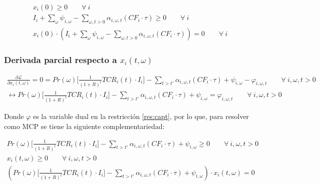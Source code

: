 \begin{footnotesize}
\begin{align}
    x_i(0)\geq 0 \qquad \forall \  i \\
    I_i  + \sum_{\omega}\psi_{i,\omega} -\sum_{\omega, t>0} \alpha_{i,\omega,t}(CF_i\cdot \tau) \geq 0  \qquad \forall \  i\\
    x_i(0)\cdot(I_i  + \sum_{\omega}\psi_{i,\omega} -\sum_{\omega, t>0} \alpha_{i,\omega,t}(CF_i\cdot \tau))=0 \qquad \forall \  i
\end{align}
\end{footnotesize}



\subsubsection{Derivada parcial respecto a $x_i(t,\omega)$}

\begin{footnotesize}
\begin{align}
    \frac{\partial \mathcal{L} }{\partial x_i(t,\omega)}= 0 = Pr(\omega) \Bigg[\frac{1}{(1+R)^t}TCR_i(t) \cdot I_i \Bigg] - \sum_{t> t\prime}\alpha_{i,\omega,t} ( CF_i \cdot \tau)+ \psi_{i,\omega}-\varphi_{i,\omega,t} \qquad  \forall \  i, \omega, t> 0\\
    \leftrightarrow Pr(\omega) \Bigg[\frac{1}{(1+R)^t}TCR_i(t) \cdot I_i \Bigg] - \sum_{t> t\prime}\alpha_{i,\omega,t} ( CF_i \cdot \tau)+ \psi_{i,\omega}=\varphi_{i,\omega,t} \qquad  \forall \  i, \omega, t> 0
\end{align}
\end{footnotesize}


Donde $\varphi$ es la variable dual en la restricción \ref{res:capt}, por lo que, para resolver como MCP se tiene la siguiente complementariedad:


\begin{footnotesize}
\begin{align}
    Pr(\omega) \Bigg[\frac{1}{(1+R)^t}TCR_i(t) \cdot I_i \Bigg] - \sum_{t> t\prime}\alpha_{i,\omega,t} ( CF_i \cdot \tau)+ \psi_{i,\omega} \geq 0 \qquad  \forall \  i, \omega, t> 0\\
    x_i(t,\omega) \geq 0 \qquad  \forall \  i, \omega, t> 0\\
    (Pr(\omega) \Bigg[\frac{1}{(1+R)^t}TCR_i(t) \cdot I_i \Bigg] - \sum_{t> t\prime}\alpha_{i,\omega,t} ( CF_i \cdot \tau)+ \psi_{i,\omega})\cdot x_i(t,\omega)=0
\end{align}

\end{footnotesize}


